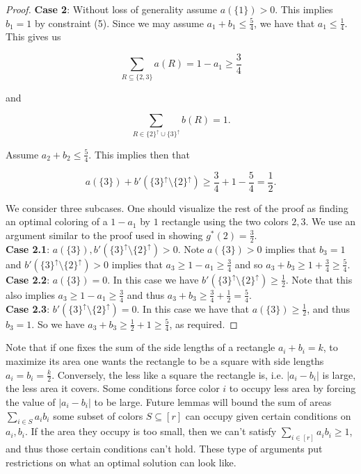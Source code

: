 \documentclass{article}
\begin{document}
\begin{proof}
\textbf{Case 2}: Without loss of generality assume $a(\{1\}) > 0$. This implies $b_1 = 1$ by constraint (5). Since we may assume $a_1 + b_1 \leq \frac{5}{4}$, we have that $a_1 \leq \frac{1}{4}$. This gives us

$$\sum_{R \subseteq \{2,3\}} a(R) = 1-a_1 \geq \frac{3}{4}$$

\noindent 
and

$$\sum_{R \in \{2\}^{\uparrow} \cup \{3\}^{\uparrow}} b(R) = 1.$$

Assume $a_2 + b_2 \leq \frac{5}{4}$. This implies then that 

$$a(\{3\}) + b'(\{3\}^{\uparrow} \setminus \{2\}^{\uparrow}) \geq \frac{3}{4} + 1 - \frac{5}{4} = \frac{1}{2}.$$

\noindent
We consider three subcases. One should visualize the rest of the proof as finding an optimal coloring of a $1-a_1$ by $1$ rectangle using the two colors $2,3$. We use an argument similar to the proof used in showing $g^*(2) = \frac{3}{2}$. \\

\textbf{Case 2.1}: $a(\{3\}), b'(\{3\}^{\uparrow} \setminus \{2\}^{\uparrow}) > 0$. Note $a(\{3\}) > 0$ implies that $b_3 = 1$ and  $b'(\{3\}^{\uparrow} \setminus \{2\}^{\uparrow}) > 0$ implies that $a_3 \geq 1 - a_1 \geq \frac{3}{4}$ and so $a_3+b_3 \geq 1 + \frac{3}{4} \geq \frac{5}{4}$. \\

\textbf{Case 2.2}: $a(\{3\}) = 0$. In this case we have $b'(\{3\}^{\uparrow} \setminus \{2\}^{\uparrow}) \geq \frac{1}{2}$. Note that this also implies $a_3 \geq 1-a_1 \geq \frac{3}{4}$ and thus $a_3 + b_3 \geq \frac{3}{4} + \frac{1}{2} = \frac{5}{4}$. \\

\textbf{Case 2.3}: $b'(\{3\}^{\uparrow} \setminus \{2\}^{\uparrow}) = 0$. In this case we have that $a(\{3\}) \geq \frac{1}{2}$, and thus $b_3 = 1$. So we have $a_3 + b_3 \geq \frac{1}{2} + 1 \geq \frac{5}{4}$, as required. 
\end{proof}

Note that if one fixes the sum of the side lengths of a rectangle $a_i + b_i = k$, to maximize its area one wants the rectangle to be a square with side lengths $a_i = b_i = \frac{k}{2}$. Conversely, the less like a square the rectangle is, i.e. $|a_i-b_i|$ is large, the less area it covers. Some conditions force color $i$ to occupy less area by forcing the value of $|a_i-b_i|$ to be large. Future lemmas will bound the sum of areas $\sum_{i \in S} a_ib_i$ some subset of colors $S \subseteq [r]$ can occupy given certain conditions on $a_i,b_i$. If the area they occupy is too small, then we can't satisfy $\sum_{i \in [r]} a_ib_i \geq 1$, and thus those certain conditions can't hold. These type of arguments put restrictions on what an optimal solution can look like. \\
\end{document}
